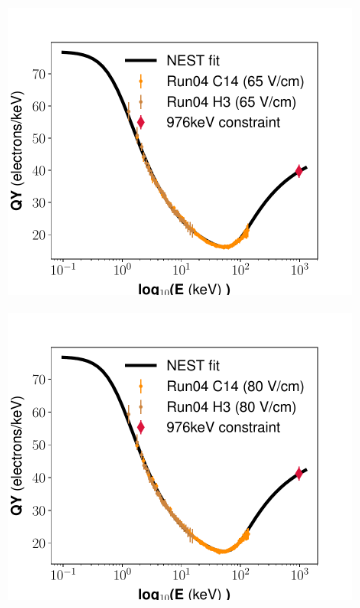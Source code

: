 \begin{figure}[h!]
\begin{subfigure}{0.5\textwidth}
  \caption{}
\end{subfigure}
\begin{subfigure}{0.5\textwidth}
  \centering
  \includegraphics[width=\textwidth]{Figures/Yields_fit_old/NEST_fit_65Vcm_old.pdf}
  \caption{}
\end{subfigure}%
\begin{subfigure}{0.5\textwidth}
  \centering
  \includegraphics[width=\textwidth]{Figures/Yields_fit_old/NEST_fit_80Vcm_old.pdf}
  \caption{}
\end{subfigure}

\end{figure}
